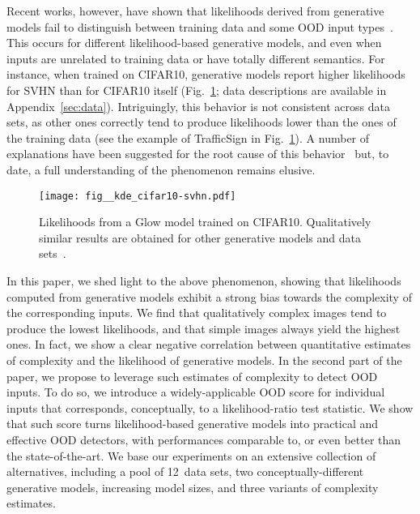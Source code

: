 \documentclass[letterpaper]{article} \usepackage{iclr2020_conference,times}
\begin{document}
Recent works, however, have shown that likelihoods derived from generative models fail to distinguish between training data and some OOD input types~\citep{Choi18ARXIV, Nalisnick19ICLR, Hendrycks19ICLR}. This occurs for different likelihood-based generative models, and even when inputs are unrelated to training data or have totally different semantics. For instance, when trained on CIFAR10, generative models report higher likelihoods for SVHN than for CIFAR10 itself (Fig.~\ref{fig:kde_cifar10svhn}; data descriptions are available in Appendix~\ref{sec:data}). Intriguingly, this behavior is not consistent across data sets, as other ones correctly tend to produce likelihoods lower than the ones of the training data (see the example of TrafficSign in Fig.~\ref{fig:kde_cifar10svhn}). A number of explanations have been suggested for the root cause of this behavior~\citep{Choi18ARXIV, Nalisnick19ICLR, Ren19NeurIPS} but, to date, a full understanding of the phenomenon remains elusive.

\begin{figure}[t]
    \begin{center}
        \texttt{[image: fig\_\_kde\_cifar10-svhn.pdf]}
    \end{center}
    \caption{Likelihoods from a Glow model trained on CIFAR10. Qualitatively similar results are obtained for other generative models and data sets~\citep[see also results in][]{Choi18ARXIV, Nalisnick19ICLR}.}
    \label{fig:kde_cifar10svhn}
\end{figure}

In this paper, we shed light to the above phenomenon, showing that likelihoods computed from generative models exhibit a strong bias towards the complexity of the corresponding inputs. We find that qualitatively complex images tend to produce the lowest likelihoods, and that simple images always yield the highest ones. In fact, we show a clear negative correlation between quantitative estimates of complexity and the likelihood of generative models. In the second part of the paper, we propose to leverage such estimates of complexity to detect OOD inputs. To do so, we introduce a widely-applicable OOD score for individual inputs that corresponds, conceptually, to a likelihood-ratio test statistic. We show that such score turns likelihood-based generative models into practical and effective OOD detectors, with performances comparable to, or even better than the state-of-the-art. We base our experiments on an extensive collection of alternatives, including a pool of 12~data sets, two conceptually-different generative models, increasing model sizes, and three variants of complexity estimates.
\end{document}
